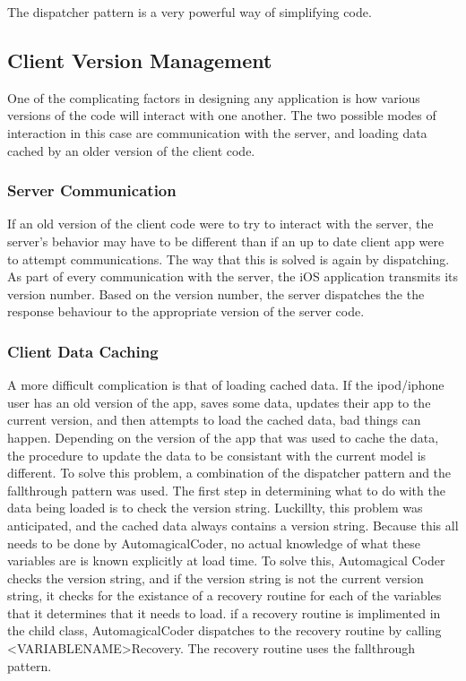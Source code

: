 \documentclass[se]{uw-wkrpt}
\begin{document}
The dispatcher pattern is a very powerful way of simplifying code.

\subsection{Client Version Management}

One of the complicating factors in designing any application is how various versions of the code will
interact with one another. The two possible modes of interaction in this case are communication with
the server, and loading data cached by an older version of the client code. 

\subsubsection{Server Communication}

If an old version of the client code were to try to interact with the server, the server's behavior
may have to be different than if an up to date client app were to attempt communications. The way that
this is solved is again by dispatching. As part of every communication with the server, the iOS application
transmits its version number. Based on the version number, the server dispatches the the response behaviour
to the appropriate version of the server code.

\subsubsection{Client Data Caching}

A more difficult complication is that of loading cached data. If the ipod/iphone user has an old version of the
app, saves some data, updates their app to the current version, and then attempts to load the cached data,
bad things can happen. Depending on the version of the app that was used to cache the data, the procedure
to update the data to be consistant with the current model is different. To solve this problem, a combination
of the dispatcher pattern and the fallthrough pattern was used. The first step in determining what to do
with the data being loaded is to check the version string. Luckillty, this problem was anticipated, and 
the cached data always contains a version string. Because this all needs to be done by AutomagicalCoder,
no actual knowledge of what these variables are is known explicitly at load time. To solve this, Automagical
Coder checks the version string, and if the version string is not the current version string, it checks for
the existance of a recovery routine for each of the variables that it determines that it needs to load.
if a recovery routine is implimented in the child class, AutomagicalCoder dispatches to the recovery 
routine by calling <VARIABLENAME>Recovery. The recovery routine uses the fallthrough pattern.
\end{document}
